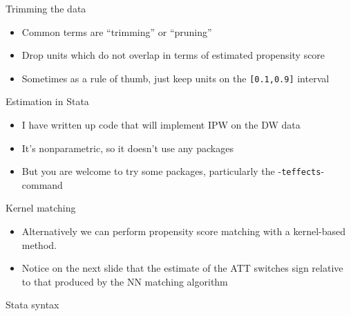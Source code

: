 \documentclass{beamer}
\begin{document}
\begin{frame}{Trimming the data}
	
	\begin{itemize}
	\item Common terms are ``trimming'' or ``pruning''
	\item Drop units which do not overlap in terms of estimated propensity score
	\item Sometimes as a rule of thumb, just keep units on the \texttt{[0.1,0.9]} interval
	\end{itemize}

\end{frame}



\begin{frame}{Estimation in Stata}
	
	\begin{itemize}
	\item I have written up code that will implement IPW on the DW data
	\item It's nonparametric, so it doesn't use any packages
	\item But you are welcome to try some packages, particularly the -\texttt{teffects}- command
	\end{itemize}
	
\end{frame}



\begin{frame}{Kernel matching}
	
	\begin{itemize}
	\item Alternatively we can perform propensity score matching with a kernel-based method. 
	\item Notice on the next slide that the estimate of the ATT switches sign relative to that produced by the NN matching algorithm
	\end{itemize}
\end{frame}


\begin{frame}{Stata syntax}

 
\end{frame}
\end{document}
